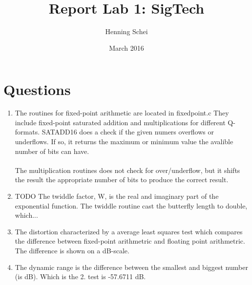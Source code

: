 \documentclass{article}
\title{Report Lab 1: SigTech}
\author{Henning Schei}
\date{March 2016}
\begin{document}
\maketitle


\section{Questions}

\begin{enumerate}
\item The routines for fixed-point arithmetic are located in fixedpoint.c They include fixed-point saturated addition and multiplications for different Q-formats. SATADD16 does a check if the given numers overflows or underflows. If so, it returns the maximum or minimum value the avalible number of bits can have.  \\ \\The multiplication routines does not check for over/underflow, but it shifts the result the appropriate number of bits to produce the correct result. 

\item TODO The twiddle factor, W, is the real and imaginary part of the exponential function. The twiddle routine cast the butterfly length to double, which...  
\item The distortion characterized by a average least squares test which compares the difference between fixed-point arithmetric and floating point arithmetric. The difference is shown on a dB-scale.  
\item The dynamic range is the difference between the smallest and biggest number (is dB). Which is the 2. test is -57.6711 dB. 

 
\end{enumerate}
\end{document}
